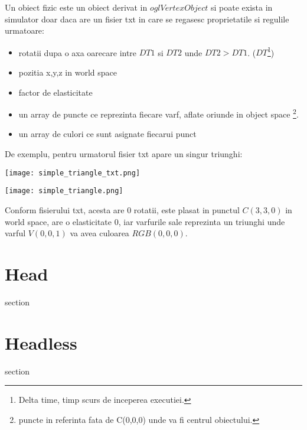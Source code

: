  Un obiect fizic este un obiect derivat in $oglVertexObject$ si poate exista in simulator doar daca are un fisier txt in care se regasesc proprietatile si regulile urmatoare:
\begin{itemize}
    \item rotatii dupa o axa oarecare intre $DT1$ si $DT2$ unde $DT2>DT1$. ($DT$\footnote{Delta time, timp scurs de inceperea executiei.})
    \item pozitia x,y,z in world space
    \item factor de elasticitate 
    \item un array de puncte ce reprezinta fiecare varf, aflate oriunde in object space \footnote{puncte in referinta fata de C(0,0,0) unde va fi centrul obiectului.}.
    \item un array de culori ce sunt asignate fiecarui punct
\end{itemize}

De exemplu, pentru urmatorul fisier txt apare un singur triunghi:
\begin{center}
\texttt{[image: simple\_triangle\_txt.png]}

\texttt{[image: simple\_triangle.png]}
\end{center}

Conform fisierului txt, acesta are 0 rotatii, este plasat in punctul $C(3,3,0)$ in world space, are o elasticitate 0, iar varfurile sale reprezinta un triunghi unde varful $V(0,0,1)$ va avea culoarea $RGB(0,0,0)$.

\section{Head}
 
section 

\section{Headless}
 
section 
